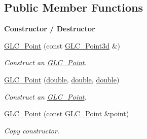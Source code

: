 \subsection*{Public Member Functions}
\begin{Indent}{\bf Constructor / Destructor}\par
\begin{DoxyCompactItemize}
\item 
\hyperlink{class_g_l_c___point_a153c47ecad66dc21983dc70655ec73b1}{G\-L\-C\-\_\-\-Point} (const \hyperlink{glc__vector3d_8h_a4e13a9bbc7ab3d34de7e98b41836772c}{G\-L\-C\-\_\-\-Point3d} \&)
\begin{DoxyCompactList}\small\item\em Construct an \hyperlink{class_g_l_c___point}{G\-L\-C\-\_\-\-Point}. \end{DoxyCompactList}\item 
\hyperlink{class_g_l_c___point_a0da2a2e20125325e962b4265211a6f2b}{G\-L\-C\-\_\-\-Point} (\hyperlink{_super_l_u_support_8h_a8956b2b9f49bf918deed98379d159ca7}{double}, \hyperlink{_super_l_u_support_8h_a8956b2b9f49bf918deed98379d159ca7}{double}, \hyperlink{_super_l_u_support_8h_a8956b2b9f49bf918deed98379d159ca7}{double})
\begin{DoxyCompactList}\small\item\em Construct an \hyperlink{class_g_l_c___point}{G\-L\-C\-\_\-\-Point}. \end{DoxyCompactList}\item 
\hyperlink{class_g_l_c___point_aa71f7a28e72011669dcb9d2622f940ba}{G\-L\-C\-\_\-\-Point} (const \hyperlink{class_g_l_c___point}{G\-L\-C\-\_\-\-Point} \&point)
\begin{DoxyCompactList}\small\item\em Copy constructor. \end{DoxyCompactList}\end{DoxyCompactItemize}
\end{Indent}
